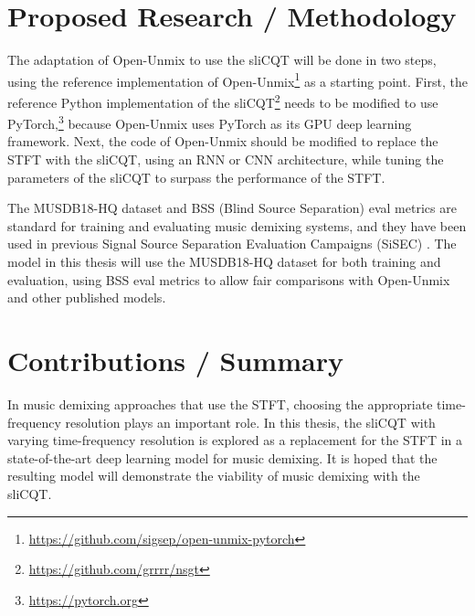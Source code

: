 \documentclass[letter,12pt]{article}
\begin{document}
\section{Proposed Research / Methodology}

The adaptation of Open-Unmix to use the sliCQT will be done in two steps, using the reference implementation of Open-Unmix\footnote{\url{https://github.com/sigsep/open-unmix-pytorch}} as a starting point. First, the reference Python implementation of the sliCQT\footnote{\url{https://github.com/grrrr/nsgt}} needs to be modified to use PyTorch,\footnote{\url{https://pytorch.org}} because Open-Unmix uses PyTorch as its GPU deep learning framework. Next, the code of Open-Unmix should be modified to replace the STFT with the sliCQT, using an RNN or CNN architecture, while tuning the parameters of the sliCQT to surpass the performance of the STFT.

The MUSDB18-HQ dataset \parencite{musdb18hq} and BSS (Blind Source Separation) eval metrics \parencite{bss} are standard for training and evaluating music demixing systems, and they have been used in previous Signal Source Separation Evaluation Campaigns (SiSEC) \parencite{sisec2018}. The model in this thesis will use the MUSDB18-HQ dataset for both training and evaluation, using BSS eval metrics to allow fair comparisons with Open-Unmix and other published models.

\section{Contributions / Summary}

In music demixing approaches that use the STFT, choosing the appropriate time-frequency resolution plays an important role. In this thesis, the sliCQT with varying time-frequency resolution is explored as a replacement for the STFT in a state-of-the-art deep learning model for music demixing. It is hoped that the resulting model will demonstrate the viability of music demixing with the sliCQT.

\vfill
\clearpage %


\begingroup
{}
\setlength\bibitemsep{0.015em}
\printbibheading[title={References},heading=bibnumbered]
\printbibliography[heading=none]
\endgroup

\vfill
\clearpage %
\end{document}
